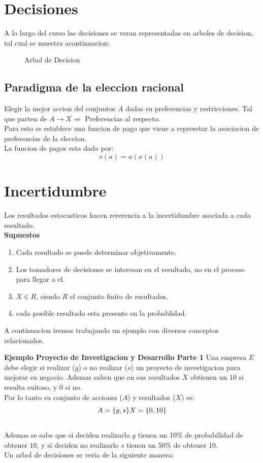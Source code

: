 \documentclass[12pt]{article}
\begin{document}
\section{Decisiones}
A lo largo del curso las decisiones se veran representadas en arboles de decision, tal cual se muestra acontinuacion: 
\begin{figure} [H]
    \centering
    
    \caption{Arbol de Decision}
    \label{fig:placeholder}
\end{figure}
\subsection{Paradigma de la eleccion racional}
Elegir la mejor accion del conjuntos $A$ dadas su preferencias y restricciones. 
Tal que parten de $A\rightarrow X \Rightarrow$ Preferencias al respecto. \\
Para esto se establece una funcion de pago que viene a represetar la asociacion de preferencias de la eleccion. \\
La funcion de pagos esta dada por: $$v(a)=u(x(a))$$

\section{Incertidumbre}
Los resultados estocasticos hacen rererencia a la incertidumbre asociada a cada resultado. \\
\textbf{Supuestos}
\begin{enumerate}
    \item Cada resultado se puede determinar objetivamente. 
    \item Los tomadores de decisiones se interesan en el resultado, no en el proceso para llegar a el. 
    \item $X\in R$, siendo $R$ el conjunto finito de resultados. 
    \item cada posible resultado esta presente en la probablidad. 
\end{enumerate}
A continuacion iremos trabajando un ejemplo con diversos conceptos relacionados. 
\begin{ejemplo}
    \textbf{Ejemplo Proyecto de Investigacion y Desarrollo Parte 1}
    Una empresa $E$ debe elegir si realizar ($g$) o no realizar ($s$) un proyecto de investigacion para mejorar su negocio. Ademas saben que en sus resultados $X$ obtienen un $10$ si resulta exitoso, y $0$ si no. \\
    Por lo tanto su conjunto de acciones ($A$) y resultados ($X$) es:
    $$A=\{g,s\}\\X=\{0,10\}$$\\
    Ademas se sabe que si deciden realizarlo $g$ tienen un 10\% de probabilidad de obtener $10$, y si deciden no realizarlo $s$ tienen un 50\% de obtener 10. \\
    Un arbol de decisiones se veria de la siguiente manera: \\
    \begin{figure} [H]
        \centering
        
        \label{fig:placeholder}
    \end{figure}
\end{ejemplo}
\end{document}
